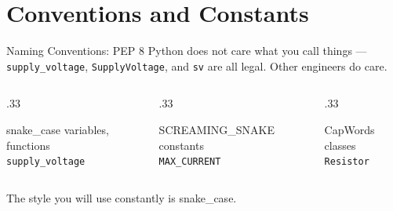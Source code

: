 \documentclass[9pt,aspectratio=169,xcolor=table]{beamer}
\begin{document}
\section{Conventions and Constants}

\begin{frame}{Naming Conventions: PEP 8}
    \leavevmode
    Python does not care what you call things --- \texttt{supply\_voltage},
    \texttt{SupplyVoltage}, and \texttt{sv} are all legal. Other engineers
    \alert{do} care.

    \vspace{3mm}
    \begin{columns}[t]
        \begin{column}{.33\textwidth}
            \begin{block}{\scriptsize snake\_case}
                \scriptsize variables, functions \\
                \texttt{\scriptsize supply\_voltage}
            \end{block}
        \end{column}
        \begin{column}{.33\textwidth}
            \begin{block}{\scriptsize SCREAMING\_SNAKE}
                \scriptsize constants \\
                \texttt{\scriptsize MAX\_CURRENT}
            \end{block}
        \end{column}
        \begin{column}{.33\textwidth}
            \begin{block}{\scriptsize CapWords}
                \scriptsize classes \\
                \texttt{\scriptsize Resistor}
            \end{block}
        \end{column}
    \end{columns}

    \vspace{3mm}
    {\small The style you will use constantly is \alert{snake\_case}.}
\end{frame}
\end{document}
